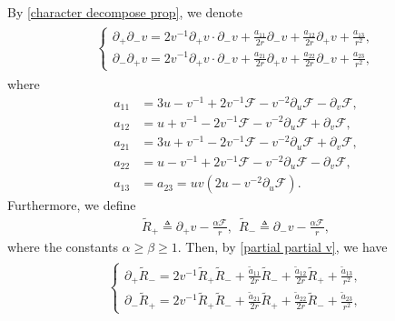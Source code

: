 \documentclass[10pt,leqno]{amsart}
\numberwithin{equation}{section}
\begin{document}
By \eqref{character decompose prop}, we denote
\begin{equation} \label{partial partial v}
	\begin{aligned}
		\begin{split}
			\left\lbrace
			\begin{array}{lr}	
				\partial_{+} \partial_{-}v =2 v^{-1} \partial_{+}v \cdot \partial_{-} v + \frac{a_{11}}{2r} \partial_{-}v+ \frac{a_{12}}{2r}\partial_{+}v + \frac{a_{13}}{r^2}, \\
				\partial_{-} \partial_{+}v = 2 v^{-1} \partial_{+}v \cdot \partial_{-} v + \frac{a_{21}}{2r}\partial_{+}v+ \frac{a_{22}}{2r}\partial_{-}v + \frac{a_{23}}{r^2},
			\end{array}	
			\right.
		\end{split}	
	\end{aligned}
\end{equation}
where
\begin{equation} \label{coefficient a} 
	\begin{aligned}
		a_{11} & =3u-v^{-1}+2v^{-1} \mathcal{F}- v^{-2} \partial_{u} \mathcal{F} - \partial_{v} \mathcal{F}, \\
		a_{12} & =u+v^{-1}-2v^{-1} \mathcal{F}- v^{-2} \partial_{u} \mathcal{F} + \partial_{v} \mathcal{F}, \\
		a_{21} & =3u+v^{-1}-2v^{-1} \mathcal{F}- v^{-2} \partial_{u} \mathcal{F} + \partial_{v} \mathcal{F}, \\
		a_{22} & =u - v^{-1} + 2v^{-1} \mathcal{F}- v^{-2} \partial_{u} \mathcal{F} - \partial_{v} \mathcal{F}, \\
		a_{13}&  = a_{23} = uv(2u-v^{-2}\partial_{u} \mathcal{F}).
	\end{aligned}
\end{equation}	
Furthermore, we define
\begin{equation} 
	\begin{aligned}
		\tilde{R}_{+} \triangleq  \partial_{+} v - \frac{\alpha\mathcal{F}}{r},\ \ \tilde{R}_{-} \triangleq \partial_{-} v - \frac{\alpha\mathcal{F}}{r},
	\end{aligned}
\end{equation}
where the constants $\alpha \geq \beta \geq 1$. Then, by \eqref{partial partial v}, we have
\begin{equation} \label{eq of partial R}
	\begin{aligned}
		\begin{split}
			\left\lbrace
			\begin{array}{lr}	
				\partial_{+} \tilde{R}_{-} = 2 v^{-1}\tilde{R}_{+}\tilde{R}_{-} + \frac{\tilde{a}_{11}}{2r} \tilde{R}_{-}+ \frac{\tilde{a}_{12}}{2r}\tilde{R}_{+} + \frac{\tilde{a}_{13}}{r^2}, \\
				\partial_{-} \tilde{R}_{+} = 2 v^{-1}\tilde{R}_{+}\tilde{R}_{-} + \frac{\tilde{a}_{21}}{2r}\tilde{R}_{+}+ \frac{\tilde{a}_{22}}{2r}\tilde{R}_{-} + \frac{\tilde{a}_{23}}{r^2}, 
			\end{array}	
			\right.
		\end{split}	
	\end{aligned}
\end{equation}
\end{document}
